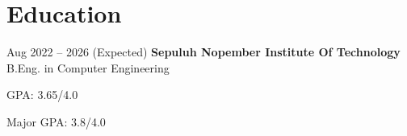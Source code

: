 \section{Education}

    \begin{twocolentry}{
        Aug 2022 – 2026 (Expected)
    }
    \textbf{Sepuluh Nopember Institute Of Technology}\\
    B.Eng. in Computer Engineering\end{twocolentry}

    \vspace{0.10 cm}
    \begin{onecolentry}
        \begin{highlights}
            \item GPA: 3.65/4.0
            \item Major GPA: 3.8/4.0
        \end{highlights}
    \end{onecolentry}
